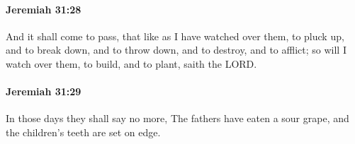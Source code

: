 		\paragraph{Jeremiah 31:28} %
			\label{JEREMIAH-31-28}

			And it shall come to pass, that like as I have watched over them, to pluck up, and to break down, and to throw down, and to destroy, and to afflict; so will I watch over them, to build, and to plant, saith the LORD.


		\paragraph{Jeremiah 31:29} %
			\label{JEREMIAH-31-29}

			In those days they shall say no more, The fathers have eaten a sour grape, and the children’s teeth are set on edge.


